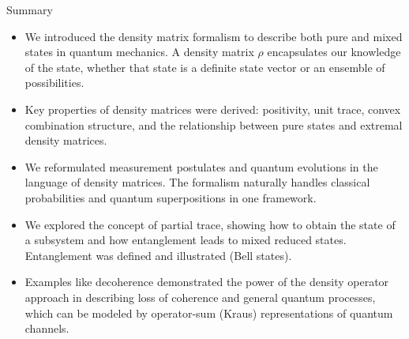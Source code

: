 \begin{frame}{Summary}
  \begin{itemize}
    \item We introduced the density matrix formalism to describe both pure and mixed states in quantum mechanics. A density matrix $\rho$ encapsulates our knowledge of the state, whether that state is a definite state vector or an ensemble of possibilities.
    \item Key properties of density matrices were derived: positivity, unit trace, convex combination structure, and the relationship between pure states and extremal density matrices.
    \item We reformulated measurement postulates and quantum evolutions in the language of density matrices. The formalism naturally handles classical probabilities and quantum superpositions in one framework.
    \item We explored the concept of partial trace, showing how to obtain the state of a subsystem and how entanglement leads to mixed reduced states. Entanglement was defined and illustrated (Bell states).
    \item Examples like decoherence demonstrated the power of the density operator approach in describing loss of coherence and general quantum processes, which can be modeled by operator-sum (Kraus) representations of quantum channels.
  \end{itemize}
  \vspace{2ex}
\end{frame}


